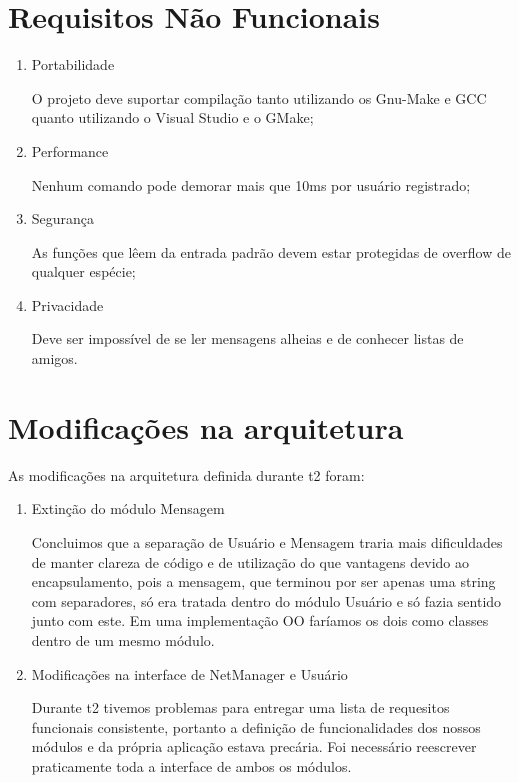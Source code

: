\documentclass[a4paper,8pt]{article}
\begin{document}
\section{Requisitos Não Funcionais}

\begin{enumerate}


\item Portabilidade

O projeto deve suportar compilação tanto utilizando os Gnu-Make e GCC quanto
utilizando o Visual Studio e o GMake;

\item Performance

Nenhum comando pode demorar mais que 10ms por usuário registrado;

\item Segurança

As funções que lêem da entrada padrão devem estar protegidas de
overflow de qualquer espécie;

\item Privacidade

Deve ser impossível de se ler mensagens alheias e de conhecer listas de
amigos.

\end{enumerate}

\section{Modificações na arquitetura}

As modificações na arquitetura definida durante t2 foram:

\begin{enumerate}
\item Extinção do módulo Mensagem

Concluimos que a separação de Usuário e Mensagem traria mais
dificuldades de manter clareza de código e de utilização do que vantagens
devido ao encapsulamento, pois a mensagem, que terminou por ser apenas uma
string com separadores, só era tratada dentro do módulo Usuário e só fazia
sentido junto com este. Em uma implementação OO faríamos os dois como classes
dentro de um mesmo módulo.

\item Modificações na interface de NetManager e Usuário

Durante t2 tivemos problemas para entregar uma lista de requesitos funcionais
consistente, portanto a definição de funcionalidades dos nossos módulos e da
própria aplicação estava precária. Foi necessário reescrever praticamente toda
a interface de ambos os módulos.

\end{enumerate}
\end{document}
